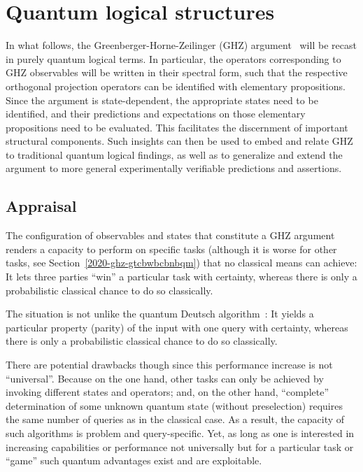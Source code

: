 \documentclass[sn-mathphys]{sn-jnl}%
\theoremstyle{thmstyleone}%
\theoremstyle{thmstyletwo}%
\theoremstyle{thmstylethree}%
\begin{document}
\setcounter{MaxMatrixCols}{20}

\section{Quantum logical structures}

In what follows, the Greenberger-Horne-Zeilinger (GHZ) argument~\cite{ghz}
will be recast in purely quantum logical terms.
In particular, the operators corresponding to GHZ observables will be written in their spectral form,
such that the respective orthogonal projection operators can be identified with elementary propositions.
Since the argument is state-dependent, the appropriate states need to be identified,
and their predictions and expectations on those elementary propositions need to be evaluated.
This facilitates the discernment of important structural components.
Such insights can then be used to embed and relate GHZ to traditional quantum logical findings,
as well as to generalize and extend the argument to more general experimentally verifiable predictions and assertions.

\subsection{Appraisal}

The configuration of observables and states that constitute a
GHZ argument
renders a capacity to perform on specific tasks (although it is worse for other tasks, see Section~\ref{2020-ghz-gtcbwbcbnbqm})
that no classical means can achieve:
It lets three parties ``win'' a particular task with certainty,
whereas there is only a probabilistic classical chance to do so classically.

The situation is not unlike the quantum Deutsch algorithm~\cite[Section~2.2]{mermin-07}:
It yields a particular property (parity) of the input with one query with certainty,
whereas there is only a probabilistic classical chance to do so classically.

There are potential drawbacks though since this performance increase is not ``universal''.
Because on the one hand, other tasks can only be achieved by invoking different states and operators;
and, on the other hand, ``complete'' determination of some unknown
quantum state (without preselection) requires the same number of queries as in the classical case.
As a result, the capacity of such algorithms is problem and query-specific.
Yet, as long as one is interested in increasing capabilities or performance
not universally but for a particular task or ``game''
such quantum advantages exist and are exploitable.
\end{document}
